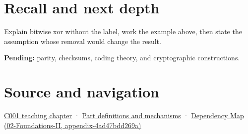 \section{Recall and next depth}\label{appendix-d49161831368-recall-and-next-depth}

Explain bitwise xor without the label, work the example above, then state the assumption whose removal would change the result.

\textbf{Pending:} parity, checksums, coding theory, and cryptographic constructions.

\section{Source and navigation}\label{appendix-d49161831368-source-and-navigation}

\href{Continuous\%20Notes/Computing\%20Foundations\%20-\%20From\%20Bits\%20to\%20C++\%20and\%20Systems\%20APIs\#From\%20a\%20signal\%20to\%20an\%20interpretation}{C001 teaching chapter} · \hyperref[appendix-fd090d982a15]{Part definitions and mechanisms} · \href{../02-Foundations-II/main.pdf\#nameddest=appendix-4ad47bdd269a}{Dependency Map (02-Foundations-II, appendix-4ad47bdd269a)}
